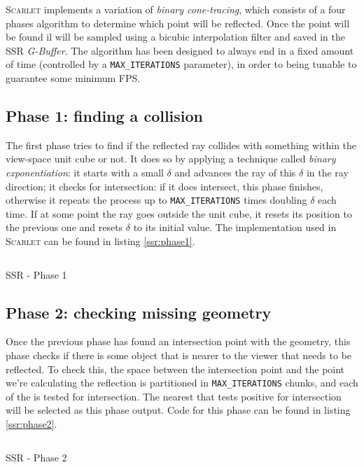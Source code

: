 \documentclass[11pt,a4paper]{report}
\begin{document}
\textsc{Scarlet} implements a variation of \textit{binary cone-tracing}, which consists of a four phases algorithm to determine which point will be reflected. Once the point will be found il will be sampled using a bicubic interpolation filter and saved in the SSR \textit{G-Buffer}. The algorithm has been designed to always end in a fixed amount of time (controlled by a \texttt{MAX\_ITERATIONS} parameter), in order to being tunable to guarantee some minimum FPS.

\subsection{Phase 1: finding a collision}
The first phase tries to find if the reflected ray collides with something within the view-space unit cube or not. It does so by applying a technique called \textit{binary exponentiation}: it starts with a small $\delta$ and advances the ray of this $\delta$ in the ray direction; it checks for intersection: if it does intersect, this phase finishes, otherwise it repeats the process up to \texttt{MAX\_ITERATIONS} times doubling $\delta$ each time. If at some point the ray goes outside the unit cube, it resets its position to the previous one and resets $\delta$ to its initial value. The implementation used in \textsc{Scarlet} can be found in listing \ref{ssr:phase1}.

\begin{listing}
	\inputminted[tabsize=2, frame=lines,
framesep=2mm,
baselinestretch=1.2,
bgcolor=LightGray,
fontsize=\footnotesize,
linenos]{glsl}{code/phase1.frag}
	\caption{SSR - Phase 1}
	\label{ssr:phase1}
\end{listing}

\subsection{Phase 2: checking missing geometry}
Once the previous phase has found an intersection point with the geometry, this phase checks if there is some object that is nearer to the viewer that needs to be reflected. To check this, the space between the intersection point and the point we're calculating the reflection is partitioned in \texttt{MAX\_ITERATIONS} chunks, and each of the is tested for intersection. The nearest that tests positive for intersection will be selected as this phase output. Code for this phase can be found in listing \ref{ssr:phase2}.

\begin{listing}
	\inputminted[tabsize=2, frame=lines,
framesep=2mm,
baselinestretch=1.2,
bgcolor=LightGray,
fontsize=\footnotesize,
linenos]{glsl}{code/phase2.frag}
	\caption{SSR - Phase 2}
	\label{ssr:phase2}
\end{listing}
\end{document}
